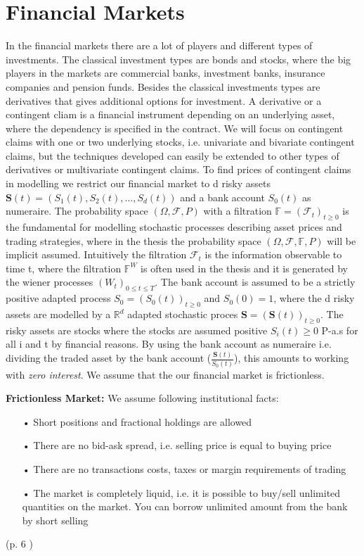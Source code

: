 \section{Financial Markets}\label{FinMarket}
In the financial markets there are a lot of players and different types of investments. The classical investment types are bonds and stocks, where the big players in the markets are commercial banks, investment banks, insurance companies and pension funds. Besides the classical investments types are derivatives that gives additional options for investment. A derivative or a contingent cliam is a financial instrument depending on an underlying asset, where the dependency is specified in the contract. We will focus on contingent claims with one or two underlying stocks, i.e. univariate and bivariate contingent claims, but the techniques developed can easily be extended to other types of derivatives or multivariate contingent claims. To find prices of contingent claims in modelling we restrict our financial market to d risky assets $\bm{S}(t)=(S_1(t), S_2(t),\ldots, S_d(t))$ and a bank account $S_0(t)$ as numeraire. The probability space $(\Omega, \mathcal{F}, P)$ with a filtration $\mathbb{F}=(\mathcal{F}_t)_{t\geq 0}$ is the fundamental for modelling stochastic processes describing asset prices and trading strategies, where in the thesis the probability space $(\Omega, \mathcal{F}, \mathbb{F}, P)$ will be implicit assumed. Intuitively the filtration $\mathcal{F}_t$ is the information observable to time t, where the filtration $\mathbb{F}^{W}$ is often used in the thesis and it is generated by the wiener processes $(W_t)_{0\leq t \leq T}$. The bank account is assumed to be a strictly positive adapted process $S_0=(S_0 (t))_{t \geq 0}$ and $S_0(0)=1$, where the d risky assets are modelled by a $\mathbb{R}^d$ adapted stochastic proces $\bm{S}=(\bm{S}(t))_{t\geq 0}$. The risky assets are stocks where the stocks are assumed positive $S_i(t)\geq 0$ P-a.s for all i and t by financial reasons. By using the bank account as numeraire i.e. dividing the traded asset by the bank account ($\frac{\bm{S}(t)}{S_0 (t)}$), this amounts to working with \textit{zero interest}. We assume that the our financial market is frictionless.
\theoremstyle{assumption}
\begin{assumption}{\textbf{Frictionless Market: }}\label{EfficientMarket}
We assume following institutional facts:
\begin{enumerate}
\item[•] Short positions and fractional holdings are allowed
\item[•] There are no bid-ask spread, i.e. selling price is equal to buying price
\item[•] There are no transactions costs, taxes or margin requirements of trading
\item[•] The market is completely liquid, i.e. it is possible to buy/sell unlimited quantities on the market. You can borrow unlimited amount from the bank by short selling
\end{enumerate}
(p. 6 \parencite{finKont})
\end{assumption}
